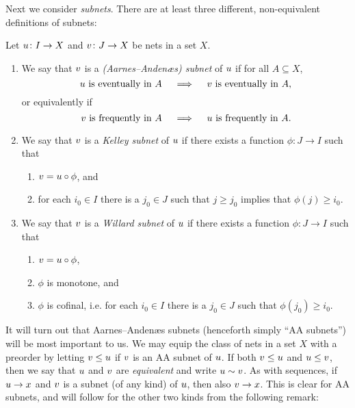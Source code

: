 \documentclass[article, a4paper, 11pt, oneside]{memoir}
\numberwithin{equation}{chapter}
\theoremstyle{nonumberplain}
\begin{document}
Next we consider \emph{subnets}. There are at least three different, non-equivalent definitions of subnets:

\begin{definition}[Subnets]
    \label{def:subnets}
    Let $u \colon I \to X$ and $v \colon J \to X$ be nets in a set $X$.
    
    \begin{enumerate}
        \item We say that $v$ is a \emph{(Aarnes--Andenæs) subnet} of $u$ if for all $A \subseteq X$,
        \begin{equation*}
            \text{$u$ is eventually in $A$}
            \quad \implies \quad
            \text{$v$ is eventually in $A$},
        \end{equation*}
        or equivalently if
        \begin{equation*}
            \text{$v$ is frequently in $A$}
            \quad \implies \quad
            \text{$u$ is frequently in $A$}.
        \end{equation*}

        \item We say that $v$ is a \emph{Kelley subnet} of $u$ if there exists a function $\phi \colon J \to I$ such that
        \begin{enumerate}
            \item $v = u \circ \phi$, and
            \item for each $i_0 \in I$ there is a $j_0 \in J$ such that $j \geq j_0$ implies that $\phi(j) \geq i_0$.
        \end{enumerate}

        \item We say that $v$ is a \emph{Willard subnet} of $u$ if there exists a function $\phi \colon J \to I$ such that
        \begin{enumerate}
            \item $v = u \circ \phi$,
            \item $\phi$ is monotone, and
            \item $\phi$ is cofinal, i.e. for each $i_0 \in I$ there is a $j_0 \in J$ such that $\phi(j_0) \geq i_0$.
        \end{enumerate}
    \end{enumerate}
\end{definition}
%
It will turn out that Aarnes--Andenæs subnets (henceforth simply \enquote{AA subnets}) will be most important to us. We may equip the class of nets in a set $X$ with a preorder by letting $v \leq u$ if $v$ is an AA subnet of $u$. If both $v \leq u$ and $u \leq v$, then we say that $u$ and $v$ are \emph{equivalent} and write $u \sim v$. As with sequences, if $u \to x$ and $v$ is a subnet (of any kind) of $u$, then also $v \to x$. This is clear for AA subnets, and will follow for the other two kinds from the following remark:
\end{document}
